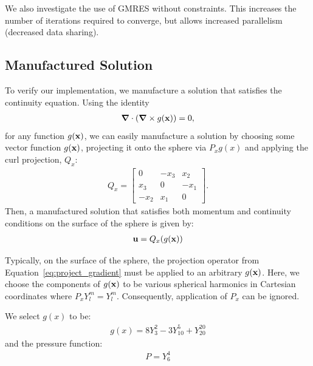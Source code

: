 We also investigate the use of GMRES without constraints. This increases the number of iterations required to converge, but allows increased parallelism (decreased data sharing). %

\subsection{Manufactured Solution}

To verify our implementation, we manufacture a solution that satisfies the continuity equation. Using the identity
\begin{align} 
\mbox{\boldmath$ \nabla $} \cdot (\mbox{\boldmath$ \nabla $} \times g(\mathbf{x})) = 0,
\end{align} 
for any function $g(\mathbf{x})$, we can easily manufacture a solution by choosing some vector function $g(\mathbf{x})$, projecting it onto the sphere via $P_x g(x)$ and applying the curl projection, $Q_x$: 
\begin{align} 
Q_x = \begin{bmatrix} 0 & -x_3 & x_2 \\ x_3 & 0 & -x_1 \\ -x_2 & x_1 & 0 \end{bmatrix}.
\end{align} 
Then, a manufactured solution that satisfies both momentum and continuity conditions on the surface of the sphere is given by: 
\begin{align} 
\mathbf{u} = Q_x (g(\mathbf{x}))
\end{align} 

Typically, on the surface of the sphere, the projection operator from Equation~\ref{eq:project_gradient} must be applied to an arbitrary $g(\mathbf{x})$. 
Here, we choose the components of $g(\mathbf{x})$ to be various spherical harmonics in Cartesian coordinates where $P_x Y_l^m = Y_l^m$. Consequently, application of $P_x$ can be ignored. 

We select $g(x)$ to be: 
\begin{align}
g(x) = 8 Y_{3}^{2} - 3Y_{10}^{5} + Y_{20}^{20} 
\end{align}
and the pressure function:
\begin{align}
P = Y_6^4 
\end{align} 

